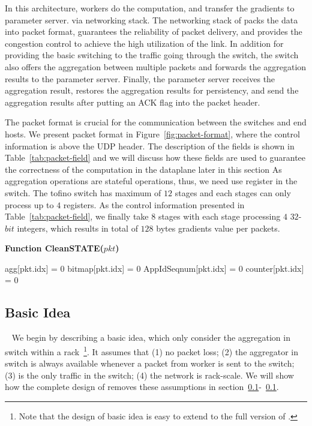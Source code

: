 In this architecture, workers do the computation, and transfer the gradients to parameter server.
via \system networking stack. The networking stack of \system packs the data into \system 
packet format, guarantees the reliability of packet delivery, and provides the congestion control
to achieve the high utilization of the link.
In addition for providing the basic switching to the traffic going through the switch, 
the switch also offers the aggregation between multiple packets and forwards the aggregation results
to the parameter server.
Finally, the parameter server receives the aggregation result, restores the aggregation results for persistency, 
and send the aggregation results after putting an ACK flag into the packet header.

The packet format is crucial for the communication between the switches and end hosts. 
We present \system packet format in Figure~\ref{fig:packet-format}, where the \system
control information is above the UDP header. The description of the fields is shown in
Table~\ref{tab:packet-field} and we will discuss how these fields are used 
to guarantee the correctness of the computation in the dataplane later in this section 
As aggregation operations are stateful operations, thus, we
need use register in the switch. The tofino switch has maximum of $12$ stages and each stages
can only process up to $4$ registers. As the control information presented in 
Table~\ref{tab:packet-field}, we finally take $8$ stages with each stage processing $4$ $32$-$bit$
integers, which results in total of $128$ bytes gradients value per packets.

\begin{algorithm}[ht!]
	\caption{\textbf{Function CleanSTATE($pkt$)}}
    \begin{algorithmic}[1]
			\STATE agg[pkt.idx] = 0
			\STATE bitmap[pkt.idx] = 0
			\STATE AppIdSeqnum[pkt.idx] = 0
			\STATE counter[pkt.idx] = 0
			\ENDIF
	\end{algorithmic}
    \label{func:stateclean}
    \end{algorithm}
\subsection{Basic Idea}~\label{basic-idea}
We begin by describing a basic idea, which only consider the aggregation in
switch within a rack~\footnote{Note that the design of basic idea is easy to extend to the full version of \system.}.
It assumes that (1) no packet loss; (2) the aggregator in switch is always available
whenever a packet from worker is sent to the switch;
(3) \system is the only traffic in the switch;
(4) the network is rack-scale.
We will show how the complete design of \system removes these assumptions in section~\ref{}-~\ref{}.

